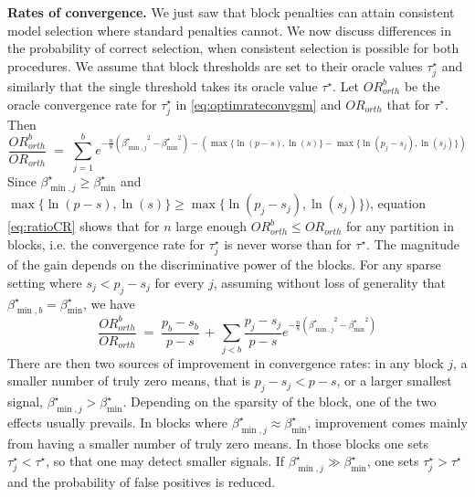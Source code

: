 \documentclass[aos]{imsart}
\theoremstyle{plain}
\newcommand{\paul}[1]{{\small{\color{green} \sf $\spadesuit$ Paul: #1}}}
\begin{document}
\noindent\textbf{Rates of convergence.}   We just saw that block penalties can attain consistent model selection where standard penalties cannot. We now discuss differences in the probability of correct selection, when consistent selection is possible for both procedures. We assume that block thresholds 
are set to their oracle values $\tau_j^\star$ 
and similarly that the single threshold
takes its oracle value $\tau^\star$.
Let ${OR}^b_{orth}$ be the oracle convergence rate for $\tau_j^\star$  in \eqref{eq:optimrateconvgsm} and ${OR}_{orth}$ that for $\tau^\star$.
Then
\begin{equation}\label{eq:ratioCR}
    \frac{{OR}^b_{orth}}{{OR}_{orth}}\;=\;\sum_{j=1}^be^{-\frac{n}{8}\left({\beta^\star_{\min,j}}^2-{\beta_{\min}^\star}^2\right)-(\max\{\ln(p-s),\ln(s)\}-\max\{\ln(p_j-s_j),\ln(s_j)\})}
\end{equation}
Since $\beta_{\min,j}^\star \geq \beta_{\min}^\star$ and $\max\{\ln(p-s),\ln(s)\}\geq\max\{\ln(p_j-s_j),\ln(s_j)\}\big)$, equation \eqref{eq:ratioCR} shows that for $n$ large enough ${OR}^b_{orth} \leq {OR}_{orth}$ for any partition in blocks, i.e. the convergence rate for $\tau_j^\star$ is never worse than for $\tau^\star$. The magnitude of the gain depends on the discriminative power of the blocks.
For any sparse setting where $s_j<p_j-s_j$ for every $j$, 
assuming without loss of generality that $\beta_{\min,b}^\star=\beta_{\min}^\star$, we have
\begin{equation}\label{eq:goodorthratio}
    \frac{{OR}^b_{orth}}{{OR}_{orth}}\;=\; \frac{p_b-s_b}{p-s} \,+\,\sum_{j<b}\frac{p_j-s_j}{p-s}e^{-\frac{n}{8}\left({\beta^\star_{\min,j}}^2-{\beta_{\min}^\star}^2\right)}
\end{equation}
There are then two sources of improvement in convergence rates: in any block $j$, a smaller number of truly zero means, that is $p_j-s_j< p-s$, or a larger smallest signal, $\beta^\star_{\min,j} > \beta_{\min}^\star$. Depending on the sparsity of the block, one of the two effects usually prevails. In blocks where $\beta^\star_{\min,j} \approx \beta_{\min}^\star$, improvement comes mainly from having a smaller number of truly zero means. In those blocks
one sets $\tau^\star_j < \tau^\star$, so that one may detect smaller signals. 
If
$\beta^\star_{\min,j} \gg \beta_{\min}^\star$,
one sets $\tau^\star_j > \tau^\star$
and the probability of false positives is reduced.
\end{document}
